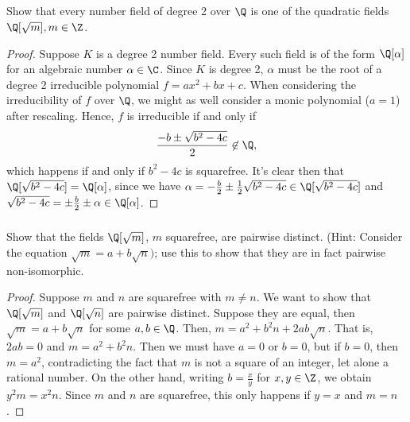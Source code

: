 \documentclass[letter,12pt]{article}
\author{\Author}
\title{\Title}
\newcommand{\Title}{Homework x}
\begin{document}
\pagestyle{fancy}
\fancyhead[L]{\Title}
\fancyhead[R]{\rightmark}
\setcounter{section}{2}
\subsection{}
\subsubsection{} Show that every number field of degree 2 over $\Q$ is one of the quadratic fields $\Q[\sqrt{m}],m\in \Z$.
\begin{proof}
    Suppose $K$ is a degree 2 number field. Every such field is of the form $\Q[\alpha]$ for an algebraic number $\alpha\in \C$. Since $K$ is degree 2, $\alpha$ must be the root of a degree 2 irreducible polynomial $f=ax^2+bx+c$. When considering the irreducibility of $f$ over $\Q$, we might as well consider a monic polynomial ($a=1$) after rescaling. Hence, $f$ is irreducible if and only if
    \[
    \frac{-b\pm \sqrt{b^2-4c}}{2}\not\in \Q,
    \]
    which happens if and only if $b^2-4c$ is squarefree. It's clear then that $\Q[\sqrt{b^2-4c}]=\Q[\alpha]$, since we have $\alpha=-\frac{b}{2}\pm \frac{1}{2}\sqrt{b^2-4c}\in \Q[\sqrt{b^2-4c}]$ and $\sqrt{b^2-4c}=\pm \frac{b}{2}\pm \alpha\in \Q[\alpha]$.
\end{proof}
\subsubsection{} Show that the fields $\Q[\sqrt{m}]$, $m$ squarefree, are pairwise distinct. (Hint: Consider the equation $\sqrt{m}=a+b\sqrt{n})$; use this to show that they are in fact pairwise non-isomorphic.
\begin{proof}
    Suppose $m$ and $n$ are squarefree with $m\ne n$. We want to show that $\Q[\sqrt{m}]$ and $\Q[\sqrt{n}]$ are pairwise distinct. Suppose they are equal, then $\sqrt{m}=a+b\sqrt{n}$ for some $a,b\in \Q$. Then, $m=a^2+b^2n+2ab\sqrt{n}$. That is, $2ab=0$ and $m=a^2+b^2n$. Then we must have $a=0$ or $b=0$, but if $b=0$, then $m=a^2$, contradicting the fact that $m$ is not a square of an integer, let alone a rational number. On the other hand, writing $b=\frac{x}{y}$ for $x,y\in \Z$, we obtain $y^2m=x^2n$. Since $m$ and $n$ are squarefree, this only happens if $y=x$ and $m=n$.
\end{proof}
\end{document}
